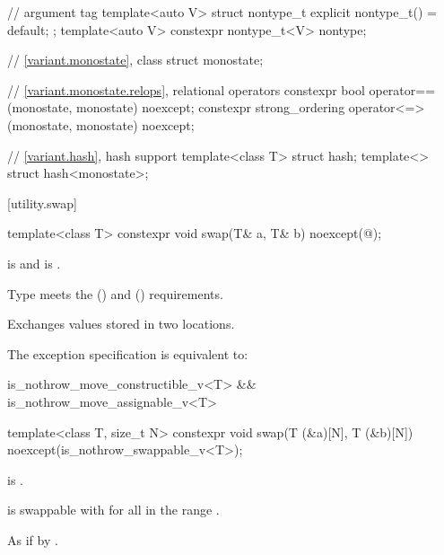 \begin{codeblock}
{  //  argument tag%
%
  template<auto V>
    struct nontype_t {
      explicit nontype_t() = default;
    };
  template<auto V> constexpr nontype_t<V> nontype{};

  // \ref{variant.monostate}, class %
  struct monostate;

  // \ref{variant.monostate.relops},  relational operators%
%
  constexpr bool operator==(monostate, monostate) noexcept;
  constexpr strong_ordering operator<=>(monostate, monostate) noexcept;

  // \ref{variant.hash}, hash support%
  template<class T> struct hash;
  template<> struct hash<monostate>;
}
\end{codeblock}

[utility.swap]{}

%
\begin{itemdecl}
template<class T>
  constexpr void swap(T& a, T& b) noexcept(@\seebelow@);
\end{itemdecl}

\begin{itemdescr}
\pnum
\constraints
{} is  and
 is .

\pnum
\expects
Type
meets the
 ()
and
 ()
requirements.

\pnum
\effects
Exchanges values stored in two locations.

\pnum
\remarks
The exception specification is equivalent to:

\begin{codeblock}
is_nothrow_move_constructible_v<T> && is_nothrow_move_assignable_v<T>
\end{codeblock}
\end{itemdescr}

%
\begin{itemdecl}
template<class T, size_t N>
  constexpr void swap(T (&a)[N], T (&b)[N]) noexcept(is_nothrow_swappable_v<T>);
\end{itemdecl}

\begin{itemdescr}
\pnum
\constraints
{} is .

\pnum
\expects
{} is swappable with 
for all  in the range .

\pnum
\effects
As if by .
\end{itemdescr}

